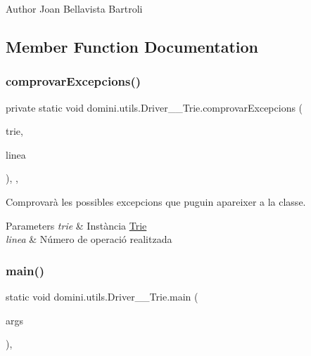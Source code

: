 \begin{DoxyAuthor}{Author}
Joan Bellavista Bartroli 
\end{DoxyAuthor}


\subsection{Member Function Documentation}
\mbox{\label{classdomini_1_1utils_1_1Driver____Trie_a6fd273250b3951144ce3a76f26330ab1}} 
\subsubsection{\texorpdfstring{comprovar\+Excepcions()}{comprovarExcepcions()}}
{\footnotesize\ttfamily private static void domini.\+utils.\+Driver\+\_\+\+\_\+\+Trie.\+comprovar\+Excepcions (\begin{DoxyParamCaption}\item[{\hyperlink{classdomini_1_1utils_1_1Trie}{Trie}$<$ Byte $>$}]{trie,  }\item[{String}]{linea }\end{DoxyParamCaption})\hspace{0.3cm}{\ttfamily [inline]}, {\ttfamily [static]}, {\ttfamily [private]}}



Comprovarà les possibles excepcions que puguin apareixer a la classe. 


\begin{DoxyParams}{Parameters}
{\em trie} & Instància \hyperlink{classdomini_1_1utils_1_1Trie}{Trie} \\
\hline
{\em linea} & Número de operació realitzada \\
\hline
\end{DoxyParams}
\mbox{\label{classdomini_1_1utils_1_1Driver____Trie_a00769a23a8d74a6f4bc05c19a2bd8519}} 
\subsubsection{\texorpdfstring{main()}{main()}}
{\footnotesize\ttfamily static void domini.\+utils.\+Driver\+\_\+\+\_\+\+Trie.\+main (\begin{DoxyParamCaption}\item[{String \mbox{[}$\,$\mbox{]}}]{args }\end{DoxyParamCaption})\hspace{0.3cm}{\ttfamily [inline]}, {\ttfamily [static]}}

